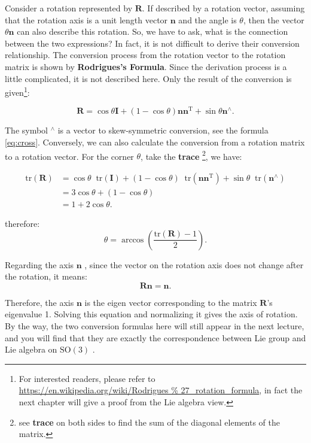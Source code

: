 Consider a rotation represented by $ \mathbf{R} $. If described by a rotation vector, assuming that the rotation axis is a unit length vector $ \mathbf{n} $ and the angle is $ \theta $, then the vector $ \theta \mathbf{n} $ can also describe this rotation. So, we have to ask, what is the connection between the two expressions? In fact, it is not difficult to derive their conversion relationship. The conversion process from the rotation vector to the rotation matrix is shown by \textbf{Rodrigues's Formula}. Since the derivation process is a little complicated, it is not described here. Only the result of the conversion is given\footnote{For interested readers, please refer to \url{https://en.wikipedia.org/wiki/Rodrigues \% 27_rotation_formula}, in fact the next chapter will give a proof from the Lie algebra view.}:

\begin{equation}
\label{eq:rogridues}
\mathbf{R} = \cos \theta \mathbf{I} + \left({ 1 - \cos \theta } \right) \mathbf{n} { \mathbf {n} ^ \mathrm{T} } + \sin \theta { \mathbf{n}^ \wedge }.
\end{equation}

The symbol $ ^ \wedge $ is a vector to skew-symmetric conversion, see the formula \eqref{eq:cross}. Conversely, we can also calculate the conversion from a rotation matrix to a rotation vector. For the corner $ \theta $, take the \textbf{trace} \footnote {see \textbf{trace} on both sides to find the sum of the diagonal elements of the matrix. }, we have:

\begin{equation}
\begin{aligned}
\mathrm{tr} \left( \mathbf{R} \right) &= \cos \theta \mathop{}\!\mathrm{tr}\left( \mathbf{I} \right) + \left( {1 - \cos \theta } \right) \mathop{}\!\mathrm{tr} \left( { \mathbf{n} {\mathbf{n}^\mathrm{T}}} \right) + \sin \theta \mathop{}\!\mathrm{tr} ({\mathbf{n}^ \wedge })\\
&= 3\cos \theta  + (1 - \cos \theta )\\
&= 1 + 2\cos \theta .
\end{aligned} 
\end{equation}

therefore:
\begin{equation}
\label{eq:R2theta}
\theta = \arccos ( \frac{\mathrm{tr}(\mathbf{R}) - 1}{2}  ) .
\end{equation}

Regarding the axis $ \mathbf{n} $ , since the vector on the rotation axis does not change after the rotation, it means:
\begin{equation}
\mathbf{R} \mathbf{n} = \mathbf{n}.
\end{equation}

Therefore, the axis $ \mathbf{n} $ is the eigen vector corresponding to the matrix $ \mathbf{R}$'s eigenvalue 1. Solving this equation and normalizing it gives the axis of rotation. By the way, the two conversion formulas here will still appear in the next lecture, and you will find that they are exactly the correspondence between Lie group and Lie algebra on $ \mathrm{SO}(3) $ .


